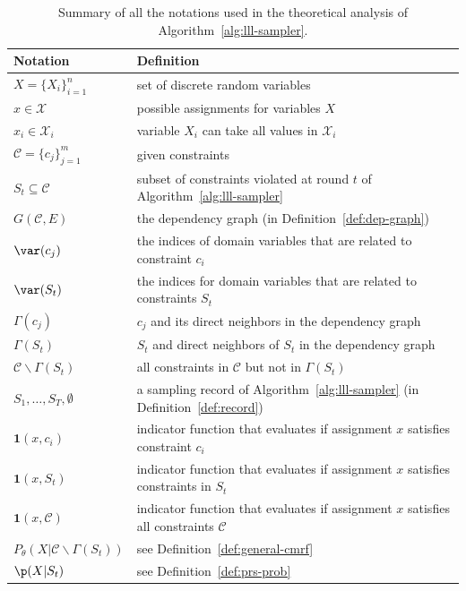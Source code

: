 \begin{table}[!t]
    \centering
    \caption{Summary of all the notations used in the theoretical analysis of Algorithm~\ref{alg:lll-sampler}.}\label{tab:quantifier}
    \begin{tabular}{ll}
    \hline
    Notation& Definition \\
    \hline
        $X=\{X_i\}_{i=1}^n$ & set of discrete random variables \\
        \hline
        $x\in\mathcal{X}$ & possible assignments for variables $X$ \\
        \hline
        $x_i\in\mathcal{X}_i$ & variable $X_i$ can take all values in $\mathcal{X}_i$\\
        \hline
        $\mathcal{C}=\{c_j\}_{j=1}^{m}$ & given constraints \\
        \hline
        $S_t\subseteq\mathcal{C}$& subset of constraints violated at round  $t$ of Algorithm~\ref{alg:lll-sampler} \\
        \hline
        $G(\mathcal{C},E)$& the dependency graph (in Definition~\ref{def:dep-graph})\\
        \hline
        $\var(c_j)$& the indices of domain variables that are related to constraint $c_i$\\
        \hline
        $\var(S_t)$& the indices for domain variables that are related to constraints $S_t$\\
        \hline
        $\Gamma(c_j)$ &$c_j$ and its direct neighbors in the dependency graph\\
        \hline
        $\Gamma(S_t)$ &$S_t$ and direct neighbors of $S_t$ in the      dependency graph\\
        \hline
        $\mathcal{C}\backslash \Gamma(S_t)$ &all constraints in $\mathcal{C}$ but not in $\Gamma(S_t)$ \\
        \hline
        $S_1,\ldots,S_{T},\emptyset$ & a sampling record of Algorithm~\ref{alg:lll-sampler}  (in Definition~\ref{def:record}) \\
        \hline
        $\mathbf{1}(x,c_i)$ & indicator function that evaluates if    assignment $x$ satisfies constraint $c_i$ \\
        \hline
        $\mathbf{1}(x,S_t)$ & indicator function that evaluates if assignment $x$ satisfies constraints in $S_t$ \\
        \hline
        $\mathbf{1}(x,\mathcal{C})$ & indicator function that evaluates if  assignment $x$ satisfies all constraints $\mathcal{C}$ \\
        \hline
        $P_{\theta}(X|\mathcal{C}\backslash\Gamma(S_t))$& see Definition~\ref{def:general-cmrf}\\
        \hline
        $\p(X|S_t)$ & see Definition~\ref{def:prs-prob}\\
    \hline
    \end{tabular}
\end{table}


